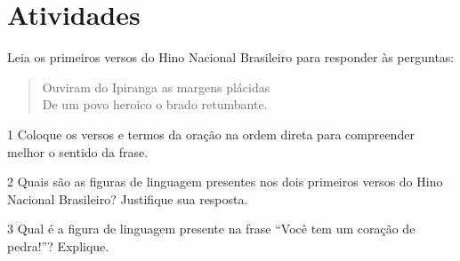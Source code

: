 
\section*{Atividades}

Leia os primeiros versos do Hino Nacional Brasileiro para responder às perguntas:

\begin{myquote} 
\begin{verse}
Ouviram do Ipiranga as margens plácidas \\
De um povo heroico o brado retumbante.
\end{verse}
\end{myquote}


\num{1} Coloque os versos e termos da oração na ordem direta para compreender 
melhor o sentido da frase. 


\num{2} Quais são as figuras de linguagem presentes nos dois primeiros versos do 
Hino Nacional Brasileiro? Justifique sua resposta.


\num{3} Qual é a figura de linguagem presente na frase ``Você tem um coração de pedra!''? 
Explique.

